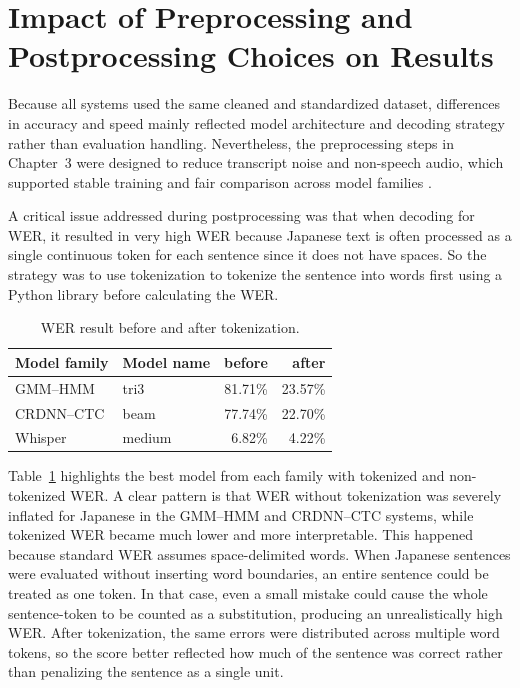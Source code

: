 \section{Impact of Preprocessing and Postprocessing Choices on Results}
Because all systems used the same cleaned and standardized dataset, differences in accuracy and speed mainly reflected model architecture and decoding strategy rather than evaluation handling. Nevertheless, the preprocessing steps in Chapter~3 were designed to reduce transcript noise and non-speech audio, which supported stable training and fair comparison across model families \parencite{latif2020, ando2021}.

A critical issue addressed during postprocessing was that when decoding for WER, it resulted in very high WER because Japanese text is often processed as a single continuous token for each sentence since it does not have spaces. So the strategy was to use tokenization to tokenize the sentence into words first using a Python library before calculating the WER.

\begin{table}[H]
\centering
\caption{WER result before and after tokenization.}
\label{tab:wer_tokenization_best_family}
\begin{tabular}{llrr}
\toprule
Model family & Model name & before & after \\
\midrule
GMM--HMM     & tri3 & 81.71\% & 23.57\%  \\
CRDNN--CTC   & beam & 77.74\% & 22.70\%  \\
Whisper      & medium & 6.82\%  & 4.22\%   \\
\bottomrule
\end{tabular}
\end{table}

Table~\ref{tab:wer_tokenization_best_family} highlights the best model from each family with tokenized and non-tokenized WER. A clear pattern is that WER without tokenization was severely inflated for Japanese in the GMM--HMM and CRDNN--CTC systems, while tokenized WER became much lower and more interpretable. This happened because standard WER assumes space-delimited words. When Japanese sentences were evaluated without inserting word boundaries, an entire sentence could be treated as one token. In that case, even a small mistake could cause the whole sentence-token to be counted as a substitution, producing an unrealistically high WER. 
After tokenization, the same errors were distributed across multiple word tokens, so the score better reflected how much of the sentence was correct rather than penalizing the sentence as a single unit.

